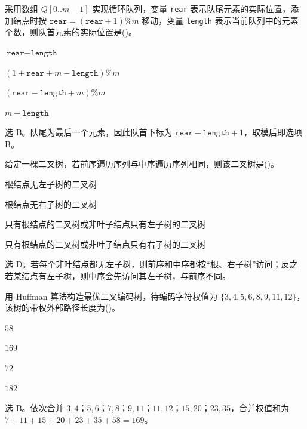 \begin{question}
采用数组 $Q[0..m-1]$ 实现循环队列，变量 \texttt{rear} 表示队尾元素的实际位置，添加结点时按 $\texttt{rear}=(\texttt{rear}+1)\%m$ 移动，变量 \texttt{length} 表示当前队列中的元素个数，则队首元素的实际位置是(\quad)。
\begin{choiceoptions}[1]
  \item $\texttt{rear}-\texttt{length}$
  \item $(1+\texttt{rear}+m-\texttt{length})\%m$
  \item $(\texttt{rear}-\texttt{length}+m)\%m$
  \item $m-\texttt{length}$
\end{choiceoptions}
\begin{solution}
选 B。队尾为最后一个元素，因此队首下标为 $\texttt{rear}-\texttt{length}+1$，取模后即选项 B。
\end{solution}
\end{question}

\begin{question}
给定一棵二叉树，若前序遍历序列与中序遍历序列相同，则该二叉树是(\quad)。
\begin{choiceoptions}[2]
  \item 根结点无左子树的二叉树
  \item 根结点无右子树的二叉树
  \item 只有根结点的二叉树或非叶子结点只有左子树的二叉树
  \item 只有根结点的二叉树或非叶子结点只有右子树的二叉树
\end{choiceoptions}
\begin{solution}
选 D。若每个非叶结点都无左子树，则前序和中序都按“根、右子树”访问；反之若某结点有左子树，则中序会先访问其左子树，与前序不同。
\end{solution}
\end{question}

\begin{question}
用 Huffman 算法构造最优二叉编码树，待编码字符权值为 $\{3,4,5,6,8,9,11,12\}$，该树的带权外部路径长度为(\quad)。
\begin{choiceoptions}[2]
  \item $58$
  \item $169$
  \item $72$
  \item $182$
\end{choiceoptions}
\begin{solution}
选 B。依次合并 $3,4$；$5,6$；$7,8$；$9,11$；$11,12$；$15,20$；$23,35$，合并权值和为 $7+11+15+20+23+35+58=169$。
\end{solution}
\end{question}

